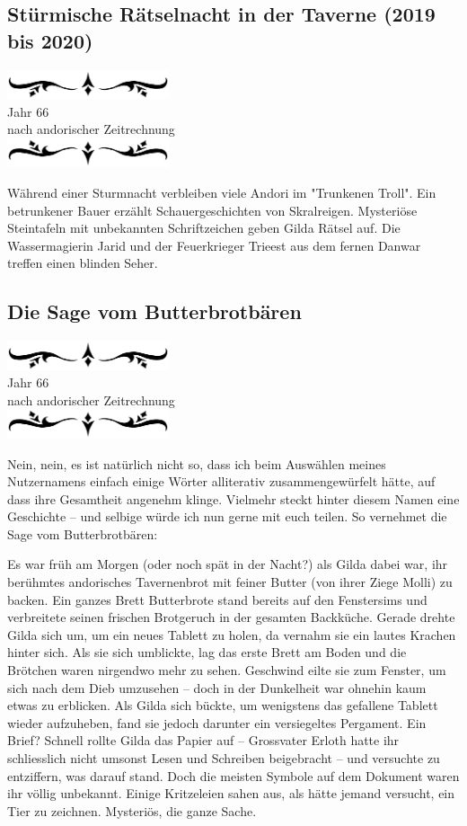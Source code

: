 \documentclass[10pt, a4paper, oneside]{book}
\newcommand{\az}[1]{%
    \begin{center}
        \includegraphics[width=180px]{Das Erbe des Wunderkindes/verzierung1.png}\\
        {\Huge #1} \\
        {nach andorischer Zeitrechnung}\\
        \includegraphics[width=180px]{Das Erbe des Wunderkindes/verzierung2.png}
    \end{center}
    \extramarks{}{#1 a.Z.}
}
\begin{document}
 























\begin{chapterbox}
    \chapter{Stürmische Rätselnacht in der Taverne (2019 bis 2020)}
    \label{Stürmische Rätselnacht in der Taverne (2019 bis 2020)}

    \az{Jahr 66}

    Während einer Sturmnacht verbleiben viele Andori im "Trunkenen Troll". Ein betrunkener Bauer erzählt Schauergeschichten von Skralreigen. Mysteriöse Steintafeln mit unbekannten Schriftzeichen geben Gilda Rätsel auf. Die Wassermagierin Jarid und der Feuerkrieger Trieest aus dem fernen Danwar treffen einen blinden Seher.
\end{chapterbox}



\section{Die Sage vom Butterbrotbären}

\az{Jahr 66}

Nein, nein, es ist natürlich nicht so, dass ich beim Auswählen meines Nutzernamens einfach einige Wörter alliterativ zusammengewürfelt hätte, auf dass ihre Gesamtheit angenehm klinge. Vielmehr steckt hinter diesem Namen eine Geschichte – und selbige würde ich nun gerne mit euch teilen. So vernehmet die Sage vom Butterbrotbären:

Es war früh am Morgen (oder noch spät in der Nacht?) als Gilda dabei war, ihr berühmtes andorisches Tavernenbrot mit feiner Butter (von ihrer Ziege Molli) zu backen. Ein ganzes Brett Butterbrote stand bereits auf den Fenstersims und verbreitete seinen frischen Brotgeruch in der gesamten Backküche. Gerade drehte Gilda sich um, um ein neues Tablett zu holen, da vernahm sie ein lautes Krachen hinter sich. Als sie sich umblickte, lag das erste Brett am Boden und die Brötchen waren nirgendwo mehr zu sehen. Geschwind eilte sie zum Fenster, um sich nach dem Dieb umzusehen – doch in der Dunkelheit war ohnehin kaum etwas zu erblicken. Als Gilda sich bückte, um wenigstens das gefallene Tablett wieder aufzuheben, fand sie jedoch darunter ein versiegeltes Pergament. Ein Brief? Schnell rollte Gilda das Papier auf – Grossvater Erloth hatte ihr schliesslich nicht umsonst Lesen und Schreiben beigebracht – und versuchte zu entziffern, was darauf stand. Doch die meisten Symbole auf dem Dokument waren ihr völlig unbekannt. Einige Kritzeleien sahen aus, als hätte jemand versucht, ein Tier zu zeichnen. Mysteriös, die ganze Sache.
\end{document}
